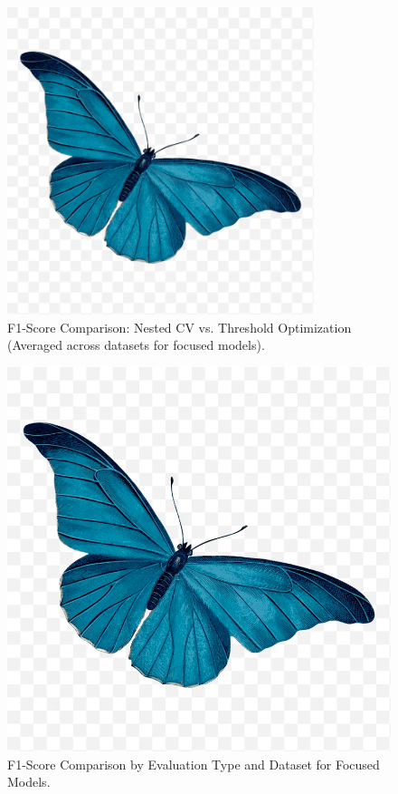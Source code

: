 \documentclass{article}
\begin{document}
\begin{figure}[htbp]
    \centering
    \includegraphics[width=0.8\textwidth]{f1-type-dataset-catplot.png} %
    \caption{F1-Score Comparison: Nested CV vs. Threshold Optimization (Averaged across datasets for focused models).}
    \label{fig:f1_type_model_comparison}
\end{figure}

\begin{figure}[htbp]
    \centering
    \includegraphics[width=\textwidth]{f1-type-dataset-catplot.png} %
    \caption{F1-Score Comparison by Evaluation Type and Dataset for Focused Models.}
    \label{fig:f1_type_dataset_comparison}
\end{figure}
\end{document}
